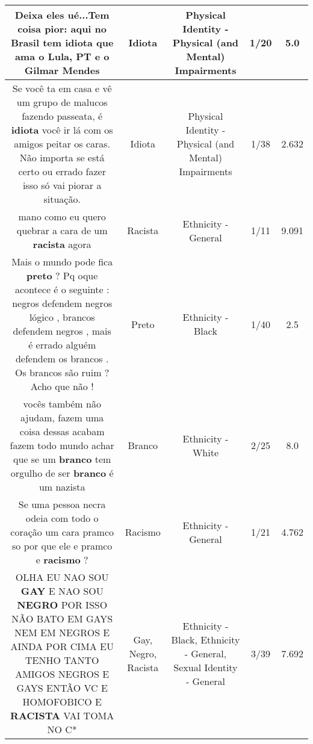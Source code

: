 \documentclass[11pt]{article}
\newlength\mylength
\begin{document}
\begin{center}
\begin{longtable}{|C{.65\mylength}|C{.30\mylength}|C{.12\mylength}|C{.12\mylength}|C{.12\mylength}|}
  \small Deixa eles ué...Tem coisa pior: aqui no Brasil tem \textbf{idiota} que ama o Lula, PT e o Gilmar Mendes\normalsize   & Idiota & Physical Identity - Physical (and Mental) Impairments & 1/20 & 5.0 \\  \hline
  \small Se você ta em casa e vê um grupo de malucos fazendo passeata, é \textbf{idiota} você ir lá com os amigos peitar os caras. Não importa se está certo ou errado fazer isso só vai piorar a situação.\normalsize   & Idiota & Physical Identity - Physical (and Mental) Impairments & 1/38 & 2.632 \\  \hline
  \small mano como eu quero quebrar a cara de um \textbf{racista} agora\normalsize   & Racista & Ethnicity - General & 1/11 & 9.091 \\  \hline
  \small Mais o mundo pode fica \textbf{preto} ? Pq oque acontece é o seguinte : negros defendem negros lógico , brancos defendem negros , mais é errado alguém defendem os brancos . Os brancos são ruim ? Acho que não !\normalsize   & Preto & Ethnicity - Black & 1/40 & 2.5 \\  \hline
  \small vocês também não ajudam, fazem uma coisa dessas  acabam fazem todo mundo  achar que se um \textbf{branco} tem orgulho de ser \textbf{branco} é um nazista\normalsize   & Branco & Ethnicity - White & 2/25 & 8.0 \\  \hline
  \small Se uma pessoa necra odeia com todo o coração um cara pramco so por que ele e pramco  e  \textbf{racismo} ?\normalsize   & Racismo & Ethnicity - General & 1/21 & 4.762 \\  \hline
  \small OLHA EU NAO SOU \textbf{GAY} E NAO SOU \textbf{NEGRO} POR ISSO NÃO BATO EM GAYS NEM EM NEGROS E AINDA POR CIMA EU TENHO TANTO AMIGOS NEGROS E GAYS ENTÃO VC E HOMOFOBICO E \textbf{RACISTA} VAI TOMA NO C*\normalsize   & Gay, Negro, Racista & Ethnicity - Black, Ethnicity - General, Sexual Identity - General & 3/39 & 7.692 \\  \hline

\end{longtable}
\end{center}
\end{document}
